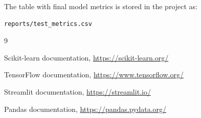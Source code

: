 \documentclass[12pt,a4paper]{article}
\begin{document}
The table with final model metrics is stored in the project as:

\begin{lstlisting}[language=bash, caption={Metrics CSV used for the report table}]
reports/test_metrics.csv
\end{lstlisting}


\newpage
\begin{thebibliography}{9}

Scikit-learn documentation, \url{https://scikit-learn.org/}

TensorFlow documentation, \url{https://www.tensorflow.org/}

Streamlit documentation, \url{https://streamlit.io/}

Pandas documentation, \url{https://pandas.pydata.org/}

\end{thebibliography}
\end{document}
